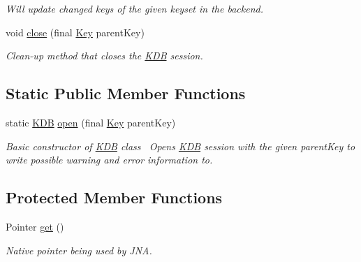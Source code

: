 \begin{DoxyCompactItemize}
\begin{DoxyCompactList}\small\item\em Will update changed keys of the given keyset in the backend. \end{DoxyCompactList}\item 
void \mbox{\hyperlink{classorg_1_1libelektra_1_1KDB_af6b472eadf78ba4ed216303b52ddb29e}{close}} (final \mbox{\hyperlink{classorg_1_1libelektra_1_1Key}{Key}} parent\+Key)
\begin{DoxyCompactList}\small\item\em Clean-\/up method that closes the \mbox{\hyperlink{classorg_1_1libelektra_1_1KDB}{K\+DB}} session. \end{DoxyCompactList}\end{DoxyCompactItemize}
\subsection*{Static Public Member Functions}
\begin{DoxyCompactItemize}
\item 
static \mbox{\hyperlink{classorg_1_1libelektra_1_1KDB}{K\+DB}} \mbox{\hyperlink{classorg_1_1libelektra_1_1KDB_ae7e6c1cea2b930a077aec11c3cbdef4b}{open}} (final \mbox{\hyperlink{classorg_1_1libelektra_1_1Key}{Key}} parent\+Key)
\begin{DoxyCompactList}\small\item\em Basic constructor of \mbox{\hyperlink{classorg_1_1libelektra_1_1KDB}{K\+DB}} class~\newline
 Opens \mbox{\hyperlink{classorg_1_1libelektra_1_1KDB}{K\+DB}} session with the given parent\+Key to write possible warning and error information to. \end{DoxyCompactList}\end{DoxyCompactItemize}
\subsection*{Protected Member Functions}
\begin{DoxyCompactItemize}
\item 
Pointer \mbox{\hyperlink{classorg_1_1libelektra_1_1KDB_a600abc786bde91a3122bd96be991a3d5}{get}} ()
\begin{DoxyCompactList}\small\item\em Native pointer being used by J\+NA. \end{DoxyCompactList}\end{DoxyCompactItemize}


